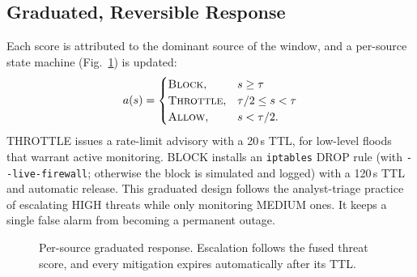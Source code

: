 \documentclass[conference]{IEEEtran}
\begin{document}
\subsection{Graduated, Reversible Response}
Each score is attributed to the dominant source of the window, and a per-source state machine (Fig.~\ref{fig:fsm}) is updated:
\begin{equation}
  a(s)=\begin{cases}
   \textsc{Block}, & s\ge\tau\\
   \textsc{Throttle}, & \tau/2\le s<\tau\\
   \textsc{Allow}, & s<\tau/2 .
  \end{cases}
\end{equation}
THROTTLE issues a rate-limit advisory with a 20\,s TTL, for low-level floods that warrant active monitoring. BLOCK installs an \texttt{iptables} DROP rule (with \texttt{-{}-live-firewall}; otherwise the block is simulated and logged) with a 120\,s TTL and automatic release. This graduated design follows the analyst-triage practice of escalating HIGH threats while only monitoring MEDIUM ones. It keeps a single false alarm from becoming a permanent outage.

\begin{figure}[t]
\centering
{}
\caption{Per-source graduated response. Escalation follows the fused threat score, and every mitigation expires automatically after its TTL.}
\label{fig:fsm}
\end{figure}
\end{document}
